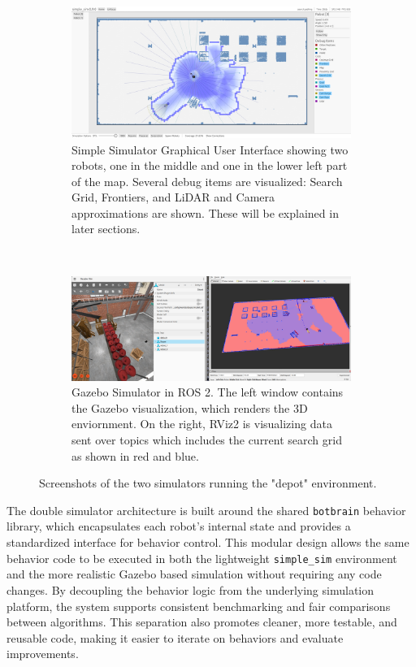 \def\w{0.95\textwidth}
\begin{figure}[H]
    \centering
    \begin{subfigure}[b]{\w}
        \centering
        \includegraphics[width=\textwidth]{./figures/screenshots/simple_sim_depot.png}
        \caption{Simple Simulator Graphical User Interface showing two robots, one in the middle and one in the lower left part of the map. Several debug items are visualized: Search Grid, Frontiers, and LiDAR and Camera approximations are shown. These will be explained in later sections.}
        \label{fig:simple_sim}
    \end{subfigure} \\
    \vspace{3mm}
    \begin{subfigure}[b]{\w}
        \centering
        \includegraphics[width=\textwidth]{./figures/screenshots/gazebo_sim_depot.png}
        \caption{Gazebo Simulator in ROS 2. The left window contains the Gazebo visualization, which renders the 3D enviornment. On the right, RViz2 is visualizing data sent over topics which includes the current search grid as shown in red and blue.}
        \label{fig:gazebo_sim}
    \end{subfigure}
    \caption{Screenshots of the two simulators running the "depot" environment.}
    \label{fig:simulators}
\end{figure}

The double simulator architecture is built around the shared \texttt{botbrain} behavior library, which encapsulates each robot’s internal state and provides a standardized interface for behavior control. This modular design allows the same behavior code to be executed in both the lightweight \texttt{simple\_sim} environment and the more realistic Gazebo based simulation without requiring any code changes. By decoupling the behavior logic from the underlying simulation platform, the system supports consistent benchmarking and fair comparisons between algorithms. This separation also promotes cleaner, more testable, and reusable code, making it easier to iterate on behaviors and evaluate improvements.

